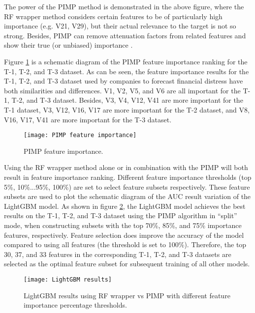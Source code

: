 \documentclass[review]{elsarticle}
\begin{document}
The power of the PIMP method is demonstrated in the above figure, where the RF wrapper method considers certain features to be of particularly high importance (e.g. V21, V29), but their actual relevance to the target is not so strong. Besides, PIMP can remove attenuation factors from related features and show their true (or unbiased) importance \citep{Altmann2010}.

Figure \ref{fig: PIMP Feature Importance} is a schematic diagram of the PIMP feature importance ranking for the T-1, T-2, and T-3 dataset. As can be seen, the feature importance results for the T-1, T-2, and T-3 dataset used by companies to forecast financial distress have both similarities and differences. V1, V2, V5, and V6 are all important for the T-1, T-2, and T-3 dataset. Besides, V3, V4, V12, V41 are more important for the T-1 dataset, V3, V12, V16, V17 are more important for the T-2 dataset, and V8, V16, V17, V41 are more important for the T-3 dataset.

\begin{figure}[H]
    \centering
    \texttt{[image: PIMP feature importance]}
    \caption{PIMP feature importance.}
    \label{fig: PIMP Feature Importance}
\end{figure}

Using the RF wrapper method alone or in combination with the PIMP will both result in feature importance ranking. Different feature importance thresholds (top 5\%, 10\%...95\%, 100\%) are set to select feature subsets respectively. These feature subsets are used to plot the schematic diagram of the AUC result variation of the LightGBM model. As shown in figure \ref{fig: RF wrapper vs PIMP}, the LightGBM model achieves the best results on the T-1, T-2, and T-3 dataset using the PIMP algorithm in ``split'' mode, when constructing subsets with the top 70\%, 85\%, and 75\% importance features, respectively. Feature selection does improve the accuracy of the model compared to using all features (the threshold is set to 100\%). Therefore, the top 30, 37, and 33 features in the corresponding T-1, T-2, and T-3 datasets are selected as the optimal feature subset for subsequent training of all other models.

\begin{figure}[H]
    \centering
    \texttt{[image: LightGBM results]}
    \caption{LightGBM results using RF wrapper vs PIMP with different feature importance percentage thresholds.}
    \label{fig: RF wrapper vs PIMP}
\end{figure}
\end{document}
